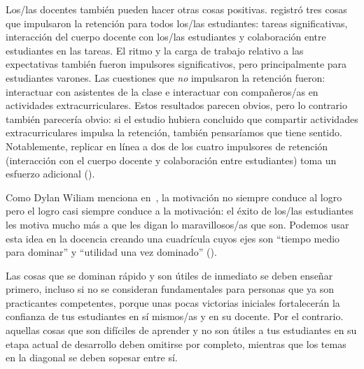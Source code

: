 Los/las docentes también pueden hacer otras cosas positivas.
\cite{Bark2014} registró tres cosas que impulsaron la retención para todos los/las estudiantes:
tareas significativas,
interacción del cuerpo docente con los/las estudiantes
y colaboración entre estudiantes en las tareas.
El ritmo y la carga de trabajo relativo a las expectativas también fueron impulsores significativos,
pero principalmente para estudiantes varones.
Las cuestiones que \emph{no} impulsaron la retención
fueron: interactuar con asistentes de la clase
e interactuar con compañeros/as en actividades extracurriculares.
Estos resultados parecen obvios,
pero lo contrario también parecería obvio:
si el estudio hubiera concluido que compartir actividades extracurriculares
impulsa la retención,
también pensaríamos que tiene sentido.
Notablemente,
replicar en línea a dos de los cuatro impulsores de retención (interacción  con el cuerpo docente y colaboración entre estudiantes)
toma un esfuerzo adicional ().


Como Dylan Wiliam menciona en~\cite{Hend2017},
la motivación no siempre conduce al logro 
pero el logro casi siempre conduce a la motivación:
el éxito de los/las estudiantes les motiva mucho más a que les digan lo maravillosos/as que son.
Podemos usar esta idea en la docencia
creando una cuadrícula cuyos ejes son ``tiempo medio para dominar''
y ``utilidad una vez dominado'' ().


Las cosas que se dominan rápido y son útiles de inmediato se deben enseñar primero,
incluso si no se consideran fundamentales para personas que ya son practicantes competentes,
porque unas pocas victorias iniciales fortalecerán la confianza de tus estudiantes en sí mismos/as y en su docente.
Por el contrario.
aquellas cosas que son difíciles de aprender y no son útiles a tus estudiantes en su etapa actual de desarrollo
deben omitirse por completo,
mientras que los temas en la diagonal se deben sopesar entre sí.

